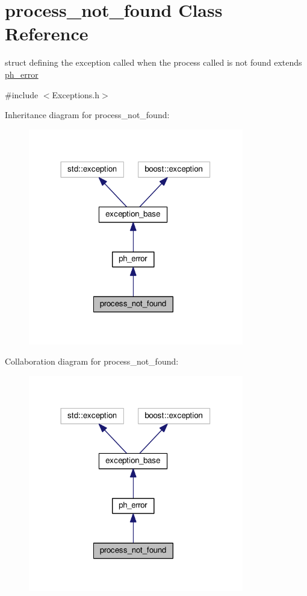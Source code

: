 \hypertarget{structprocess__not__found}{\section{process\+\_\+not\+\_\+found Class Reference}
\label{structprocess__not__found}
}


struct defining the exception called when the process called is not found extends \hyperlink{structph__error}{ph\+\_\+error}  




{\ttfamily \#include $<$Exceptions.\+h$>$}



Inheritance diagram for process\+\_\+not\+\_\+found\+:\nopagebreak
\begin{figure}[H]
\begin{center}
\leavevmode
\includegraphics[width=266pt]{structprocess__not__found__inherit__graph}
\end{center}
\end{figure}


Collaboration diagram for process\+\_\+not\+\_\+found\+:\nopagebreak
\begin{figure}[H]
\begin{center}
\leavevmode
\includegraphics[width=266pt]{structprocess__not__found__coll__graph}
\end{center}
\end{figure}


